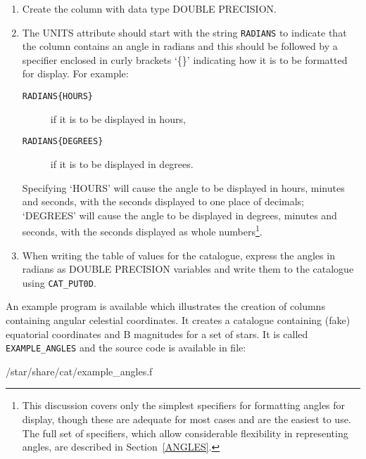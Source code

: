 \documentclass[11pt,twoside]{starlink}
\begin{document}
\begin{enumerate}

  \item Create the column with data type DOUBLE PRECISION.

  \item The UNITS attribute should start with the string \texttt{RADIANS} to indicate that the column contains an angle in
   radians and this should be followed by a specifier enclosed in
   curly brackets `\{\}' indicating how it is to be formatted for
   display. For example:

  \begin{description}

    \item[\texttt{RADIANS\{HOURS\} }] if it is to be displayed in
     hours,

    \item[\texttt{RADIANS\{DEGREES\} }] if it is to be displayed in
     degrees.

  \end{description}

   Specifying `HOURS' will cause the angle to be displayed in
   hours, minutes and seconds, with the seconds displayed to one
   place of decimals; `DEGREES' will cause the angle to be
   displayed in degrees, minutes and seconds, with the seconds
   displayed as whole numbers\footnote{This discussion covers only
   the simplest specifiers for formatting angles for display,
   though these are adequate for most cases and are the easiest to
   use. The full set of specifiers, which allow considerable
   flexibility in representing angles, are described in
   Section~\ref{ANGLES}.}.

  \item When writing the table of values for the catalogue,
   express the angles in radians as DOUBLE PRECISION variables and
   write them to the catalogue using \texttt{CAT\_PUT0D}.

\end{enumerate}

An example program is available which illustrates the creation
of columns containing angular celestial coordinates. It creates
a catalogue containing (fake) equatorial coordinates and B
magnitudes for a set of stars. It is called \texttt{EXAMPLE\_ANGLES} and
the source code is available in file:

\begin{terminalv}
/star/share/cat/example_angles.f
\end{terminalv}
\end{document}
